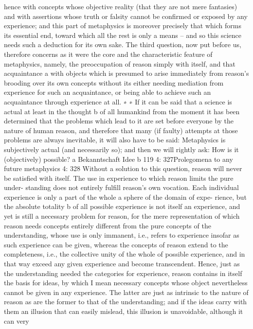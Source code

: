 hence with concepts whose objective reality (that they are not mere
fantasies) and with assertions whose truth or falsity cannot be conﬁrmed
or exposed by any experience; and this part of metaphysics is moreover
precisely that which forms its essential end, toward which all the rest
is only a means – and so this science needs such a deduction for its own
sake. The third question, now put before us, therefore concerns as it
were the core and the characteristic feature of metaphysics, namely,
the preoccupation of reason simply with itself, and that acquaintance a
with objects which is presumed to arise immediately from reason’s
brooding over its own concepts without its either needing mediation
from experience for such an acquaintance, or being able to achieve such
an acquaintance through experience at all. ∗
∗ If it can be said that a science is actual at least in the thought b of all humankind
from the moment it has been determined that the problems which lead to it are
set before everyone by the nature of human reason, and therefore that many (if
faulty) attempts at those problems are always inevitable, it will also have to be
said: Metaphysics is subjectively actual (and necessarily so); and then we will
rightly ask: How is it (objectively) possible?
a Bekanntschaft
Idee
b
119
4: 327Prolegomena to any future metaphysics
4: 328
Without a solution to this question, reason will never be satisﬁed
with itself. The use in experience to which reason limits the pure under-
standing does not entirely fulﬁll reason’s own vocation. Each individual
experience is only a part of the whole a sphere of the domain of expe-
rience, but the absolute totality b of all possible experience is not itself an
experience, and yet is still a necessary problem for reason, for the mere
representation of which reason needs concepts entirely different from
the pure concepts of the understanding, whose use is only immanent, i.e.,
refers to experience insofar as such experience can be given, whereas the
concepts of reason extend to the completeness, i.e., the collective unity
of the whole of possible experience, and in that way exceed any given
experience and become transcendent.
Hence, just as the understanding needed the categories for experience,
reason contains in itself the basis for ideas, by which I mean necessary
concepts whose object nevertheless cannot be given in any experience.
The latter are just as intrinsic to the nature of reason as are the former
to that of the understanding; and if the ideas carry with them an illusion
that can easily mislead, this illusion is unavoidable, although it can very
